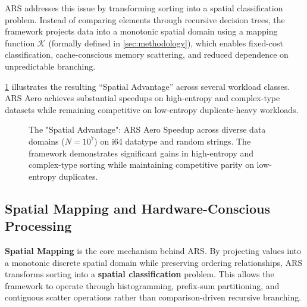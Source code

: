 ARS addresses this issue by transforming sorting into a spatial classification problem.
Instead of comparing elements through recursive decision trees, the framework projects data into a monotonic spatial domain using a mapping function $\mathcal{K}$ (formally defined in \cref{sec:methodology}), which enables fixed-cost classification, cache-conscious memory scattering, and reduced dependence on unpredictable branching.

\cref{fig:teaser} illustrates the resulting “Spatial Advantage” across several workload classes.
ARS Aero achieves substantial speedups on high-entropy and complex-type datasets while remaining competitive on low-entropy duplicate-heavy workloads.

\begin{figure}[t]
\centering
{}
\caption{The "Spatial Advantage": ARS Aero Speedup across diverse data domains ($N=10^7$) on i64 datatype and random strings. The framework demonstrates significant gains in high-entropy and complex-type sorting while maintaining competitive parity on low-entropy duplicates.}
\label{fig:teaser}
\end{figure}

\subsection{Spatial Mapping and Hardware-Conscious Processing}
\textbf{Spatial Mapping} is the core mechanism behind ARS.
By projecting values into a monotonic discrete spatial domain while preserving ordering relationships, ARS transforms sorting into a \textbf{spatial classification} problem. 
This allows the framework to operate through histogramming, prefix-sum partitioning, and contiguous scatter operations rather than comparison-driven recursive branching.

